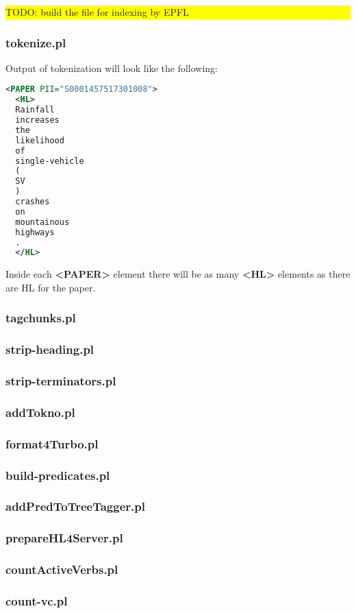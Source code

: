 \documentclass[a4paper,11pt]{report}
\newcommand{\cs}[1]{{\bfseries \ttfamily #1}}
\newcommand{\TODO}[1]{\begin{center}\bfseries \colorbox{yellow}{\parbox{0.9\textwidth}{TODO: #1}}\end{center}}
\begin{document}
\TODO{build the file for indexing by EPFL}
%
\subsubsection{tokenize.pl}
Output of tokenization will look like the following:
\begin{lstlisting}[language=XML]
  <PAPER PII="S0001457517301008">
  <HL>
  Rainfall
  increases
  the
  likelihood
  of
  single-vehicle
  (
  SV
  )
  crashes
  on
  mountainous
  highways
  .
  </HL>
\end{lstlisting}
Inside each \cs{<PAPER>} element there will be as many \cs{<HL>} elements as there are HL for the paper.
\subsubsection{tagchunks.pl}
\subsubsection{strip-heading.pl}
\subsubsection{strip-terminators.pl}
\subsubsection{addTokno.pl}
\subsubsection{format4Turbo.pl}
\subsubsection{build-predicates.pl}
\subsubsection{addPredToTreeTagger.pl}
\subsubsection{prepareHL4Server.pl}
\subsubsection{countActiveVerbs.pl}
\subsubsection{count-vc.pl}
\end{document}
